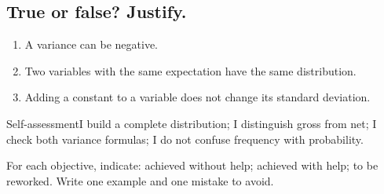 \subsection*{True or false? Justify.}\label{C08-VF}
\begin{enumerate}
\item A variance can be negative.
\item Two variables with the same expectation have the same distribution.
\item Adding a constant to a variable does not change its standard deviation.
\end{enumerate}
\begin{repere}{Self-assessment}I build a complete distribution; I distinguish gross from net; I check both variance formulas; I do not confuse frequency with probability.

For each objective, indicate: achieved without help; achieved with help; to be reworked. Write one example and one mistake to avoid.\end{repere}
\endgroup
\ifprof\fi
